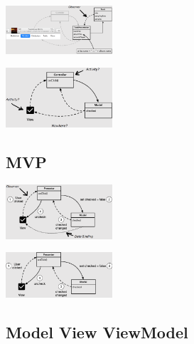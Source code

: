 \documentclass{report}
\newenvironment{Figure}
	{\par\medskip\noindent\minipage{\linewidth}}
	{\endminipage\par\medskip}
\theoremstyle{definition}
\theoremstyle{example}
\begin{document}
\begin{Figure}
   \centering
    \includegraphics[width=150px]{img/MVCPresentation.png}
        \label{fig:MVC Presentation Abbildung}
\end{Figure}

\begin{Figure}
   \centering
    \includegraphics[width=150px]{img/MVCActivity.png}
        \label{fig:MVC Activity Abbildung}
\end{Figure}

\subsection{MVP}
\begin{Figure}
   \centering
    \includegraphics[width=150px]{img/MVP.png}
        \label{fig:MVP Abbildung}
\end{Figure}

\begin{Figure}
   \centering
    \includegraphics[width=150px]{img/MVPPassiveView.png}
        \label{fig:MVP Passive View Abbildung}
\end{Figure}

\subsection{Model View ViewModel}
\end{document}
